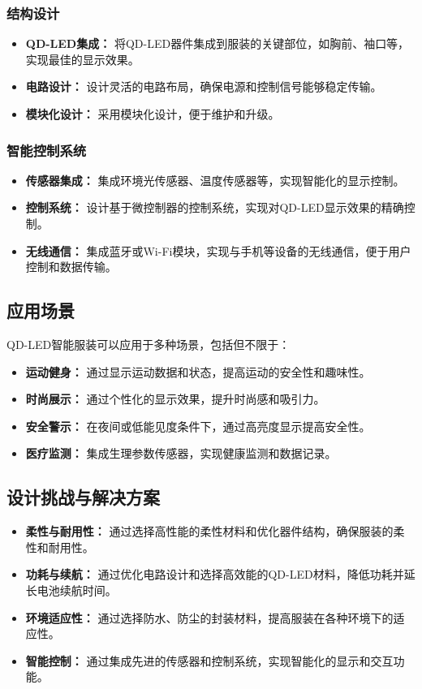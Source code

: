 \documentclass[12pt,hyperref,a4paper,UTF8]{ctexart}
\begin{document}
\subsubsection*{结构设计}
\begin{itemize}
  \item \textbf{QD-LED集成：} 将QD-LED器件集成到服装的关键部位，如胸前、袖口等，实现最佳的显示效果。
  \item \textbf{电路设计：} 设计灵活的电路布局，确保电源和控制信号能够稳定传输。
  \item \textbf{模块化设计：} 采用模块化设计，便于维护和升级。
\end{itemize}

\subsubsection*{智能控制系统}
\begin{itemize}
  \item \textbf{传感器集成：} 集成环境光传感器、温度传感器等，实现智能化的显示控制。
  \item \textbf{控制系统：} 设计基于微控制器的控制系统，实现对QD-LED显示效果的精确控制。
  \item \textbf{无线通信：} 集成蓝牙或Wi-Fi模块，实现与手机等设备的无线通信，便于用户控制和数据传输。
\end{itemize}

\subsection{应用场景}
QD-LED智能服装可以应用于多种场景，包括但不限于：
\begin{itemize}
  \item \textbf{运动健身：} 通过显示运动数据和状态，提高运动的安全性和趣味性。
  \item \textbf{时尚展示：} 通过个性化的显示效果，提升时尚感和吸引力。
  \item \textbf{安全警示：} 在夜间或低能见度条件下，通过高亮度显示提高安全性。
  \item \textbf{医疗监测：} 集成生理参数传感器，实现健康监测和数据记录。
\end{itemize}

\subsection{设计挑战与解决方案}
\begin{itemize}
  \item \textbf{柔性与耐用性：} 通过选择高性能的柔性材料和优化器件结构，确保服装的柔性和耐用性。
  \item \textbf{功耗与续航：} 通过优化电路设计和选择高效能的QD-LED材料，降低功耗并延长电池续航时间。
  \item \textbf{环境适应性：} 通过选择防水、防尘的封装材料，提高服装在各种环境下的适应性。
  \item \textbf{智能控制：} 通过集成先进的传感器和控制系统，实现智能化的显示和交互功能。
\end{itemize}
\end{document}
